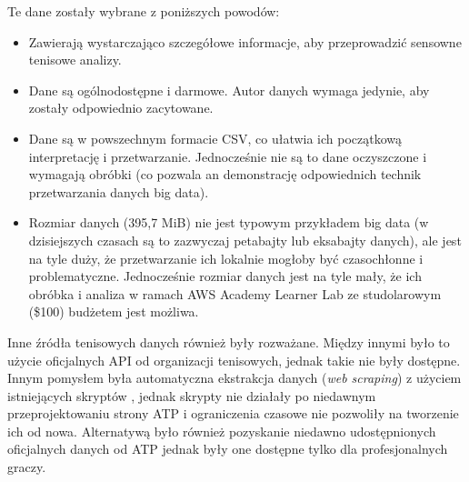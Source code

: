 \documentclass[12pt, a4paper]{article}
\begin{document}
Te dane zostały wybrane z poniższych powodów:
\begin{itemize}
    \item Zawierają wystarczająco szczegółowe informacje, aby przeprowadzić sensowne tenisowe analizy.
    \item Dane są ogólnodostępne i darmowe. Autor danych wymaga jedynie, aby zostały odpowiednio zacytowane.
    \item Dane są w powszechnym formacie CSV, co ułatwia ich początkową interpretację i przetwarzanie. Jednocześnie nie są to dane oczyszczone i wymagają obróbki (co pozwala an demonstrację odpowiednich technik przetwarzania danych big data).
    \item Rozmiar danych (395,7 MiB) nie jest typowym przykładem big data (w dzisiejszych czasach są to zazwyczaj petabajty lub eksabajty danych), ale jest na tyle duży, że przetwarzanie ich lokalnie mogłoby być czasochłonne i problematyczne. Jednocześnie rozmiar danych jest na tyle mały, że ich obróbka i analiza w ramach AWS Academy Learner Lab ze studolarowym (\$100) budżetem jest możliwa.
\end{itemize}

Inne źródła tenisowych danych również były rozważane. Między innymi było to użycie oficjalnych API od organizacji tenisowych, jednak takie nie były dostępne. Innym pomysłem była automatyczna ekstrakcja danych (\textit{web scraping}) z użyciem istniejących skryptów \cite{atp_web_scraping}, jednak skrypty nie działały po niedawnym przeprojektowaniu strony ATP i ograniczenia czasowe nie pozwoliły na tworzenie ich od nowa. Alternatywą było również pozyskanie niedawno udostępnionych oficjalnych danych od ATP \cite{atp_iq} jednak były one dostępne tylko dla profesjonalnych graczy.



\end{document}

